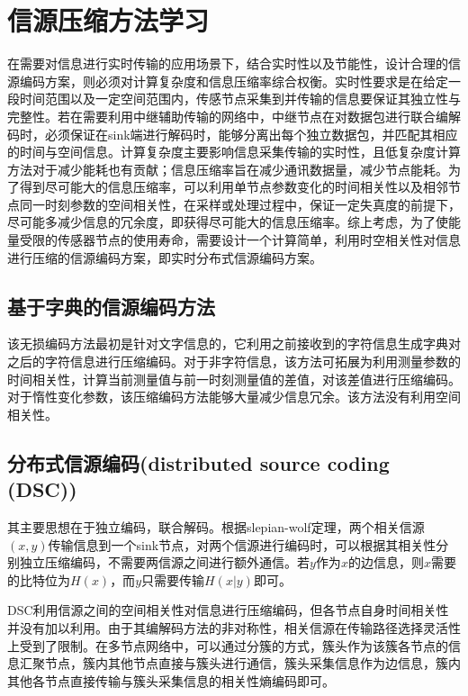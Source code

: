 \section{信源压缩方法学习}



在需要对信息进行实时传输的应用场景下，结合实时性以及节能性，设计合理的信源编码方案，则必须对计算复杂度和信息压缩率综合权衡。实时性要求是在给定一段时间范围以及一定空间范围内，传感节点采集到并传输的信息要保证其独立性与完整性。若在需要利用中继辅助传输的网络中，中继节点在对数据包进行联合编解码时，必须保证在sink端进行解码时，能够分离出每个独立数据包，并匹配其相应的时间与空间信息。计算复杂度主要影响信息采集传输的实时性，且低复杂度计算方法对于减少能耗也有贡献；信息压缩率旨在减少通讯数据量，减少节点能耗。为了得到尽可能大的信息压缩率，可以利用单节点参数变化的时间相关性以及相邻节点同一时刻参数的空间相关性，在采样或处理过程中，保证一定失真度的前提下，尽可能多减少信息的冗余度，即获得尽可能大的信息压缩率。综上考虑，为了使能量受限的传感器节点的使用寿命，需要设计一个计算简单，利用时空相关性对信息进行压缩的信源编码方案，即实时分布式信源编码方案。



\subsection{基于字典的信源编码方法}
该无损编码方法最初是针对文字信息的，它利用之前接收到的字符信息生成字典对之后的字符信息进行压缩编码。对于非字符信息，该方法可拓展为利用测量参数的时间相关性，计算当前测量值与前一时刻测量值的差值，对该差值进行压缩编码。\textcolor[rgb]{1,0,0}{对于惰性变化参数，该压缩编码方法能够大量减少信息冗余}。\textcolor[rgb]{0,0,1}{该方法没有利用空间相关性}。



\subsection{分布式信源编码(distributed source coding (DSC))}
其主要思想在于独立编码，联合解码。根据slepian-wolf定理，两个相关信源$(x,y)$传输信息到一个sink节点，对两个信源进行编码时，可以根据其相关性分别独立压缩编码，不需要两信源之间进行额外通信。若$y$作为$x$的边信息，则$x$需要的比特位为$H(x)$，而$y$只需要传输$H(x|y)$即可。

DSC利用信源之间的空间相关性对信息进行压缩编码，但各节点自身时间相关性并没有加以利用。由于其编解码方法的非对称性，相关信源在传输路径选择灵活性上受到了限制。在多节点网络中，可以通过分簇的方式，簇头作为该簇各节点的信息汇聚节点，簇内其他节点直接与簇头进行通信，簇头采集信息作为边信息，簇内其他各节点直接传输与簇头采集信息的相关性熵编码即可。

